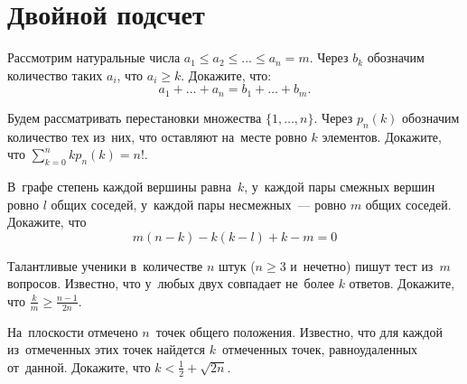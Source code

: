 
\section*{Двойной подсчет}


\begin{problems}

\item
Рассмотрим натуральные числа
$a_1 \leq a_2 \leq \ldots \leq a_n = m$.
Через $b_k$ обозначим количество таких $a_i$, что $a_i \geq k$.
Докажите, что:
\[
    a_1 + \ldots + a_n = b_1 + \ldots + b_m
.\]

\item
Будем рассматривать перестановки множества $\{ 1, \ldots, n\}$.
Через $p_n(k)$ обозначим количество тех из~них, что оставляют на~месте ровно
$k$ элементов.
Докажите, что
\(
    \sum\limits_{k = 0}^n kp_n(k) = n!
\).

\item
В~графе степень каждой вершины равна~$k$, у~каждой пары смежных вершин
ровно $l$ общих соседей, у~каждой пары несмежных~--- ровно $m$ общих соседей.
Докажите, что
\[
    m (n - k) - k (k - l) + k - m = 0
\]

\item
Талантливые ученики в~количестве $n$ штук ($n \geq 3$ и~нечетно)
пишут тест из~$m$ вопросов.
Известно, что у~любых двух совпадает не~более $k$ ответов.
Докажите, что $\frac{k}{m} \geqslant \frac{n - 1}{2n}$.

\item
На~плоскости отмечено $n$~точек общего положения.
Известно, что для каждой из~отмеченных этих точек найдется $k$~отмеченных
точек, равноудаленных от~данной.
Докажите, что $k < \frac{1}{2} + \sqrt{2n}$.





\end{problems}

